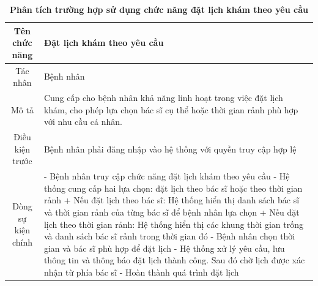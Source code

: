\begin{table}[H]
	\caption{\bfseries \fontsize{12pt}{0pt}\selectfont Phân tích trường hợp sử dụng chức năng đặt lịch khám theo yêu cầu}
	\centering
	\begin{tabularx}{0.9\textwidth}{|c|X|}
		\hline
		\textbf{Tên chức năng} & \textbf{Đặt lịch khám theo yêu cầu}                                                                                                                  \\
		\hline
		Tác nhân               & Bệnh nhân                                                                                                                                            \\
		\hline
		Mô tả                  & Cung cấp cho bệnh nhân khả năng linh hoạt trong việc đặt lịch khám, cho phép lựa chọn bác sĩ cụ thể hoặc thời gian rảnh phù hợp với nhu cầu cá nhân. \\
		\hline
		Điều kiện trước        & Bệnh nhân phải đăng nhập vào hệ thống với quyền truy cập hợp lệ                                                                                      \\
		\hline
		Dòng sự kiện chính     &
		- Bệnh nhân truy cập chức năng đặt lịch khám theo yêu cầu \newline
		- Hệ thống cung cấp hai lựa chọn: đặt lịch theo bác sĩ hoặc theo thời gian rảnh \newline
		+ Nếu đặt lịch theo bác sĩ: Hệ thống hiển thị danh sách bác sĩ và thời gian rảnh của từng bác sĩ để bệnh nhân lựa chọn \newline
		+ Nếu đặt lịch theo thời gian rảnh: Hệ thống hiển thị các khung thời gian trống và danh sách bác sĩ rảnh trong thời gian đó \newline
		- Bệnh nhân chọn thời gian và bác sĩ phù hợp để đặt lịch \newline
		- Hệ thống xử lý yêu cầu, lưu thông tin và thông báo đặt lịch thành công. Sau đó chờ lịch được xác nhận từ phía bác sĩ \newline
		- Hoàn thành quá trình đặt lịch                                                                                                                                               \\
		\hline
	\end{tabularx}
\end{table}

